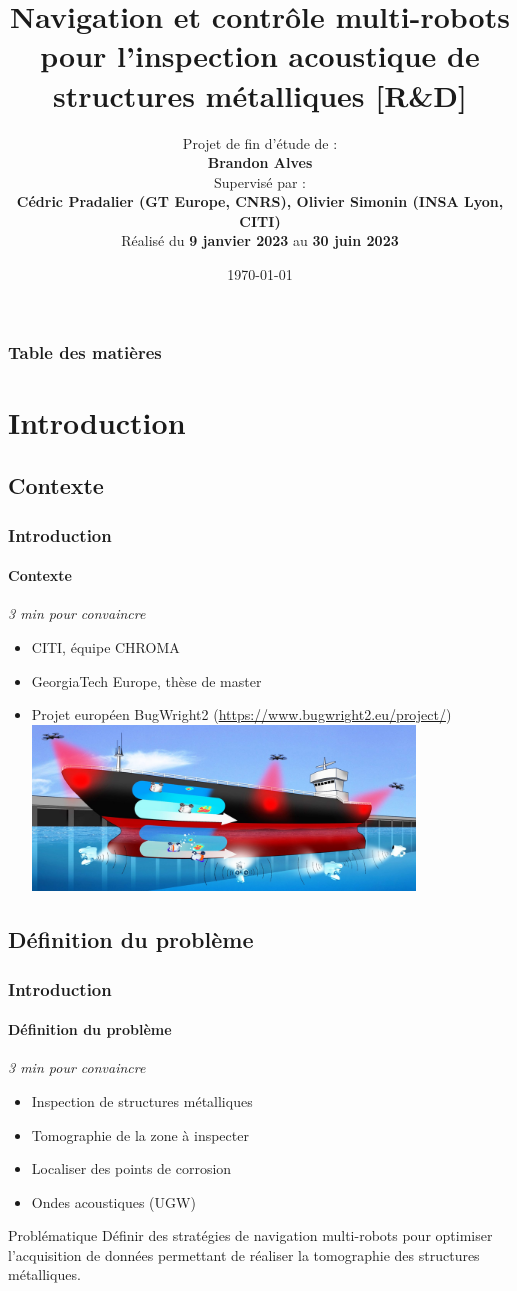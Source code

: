 \documentclass{beamer}
\title[Projet de Fin d'Étude]{Navigation et contrôle multi-robots pour l'inspection acoustique de structures métalliques [R\&D]}
\author[Brandon Alves]{
	Projet de fin d'étude de : \\
	\textbf{Brandon Alves} \\
	\vspace*{.15cm}
	\footnotesize Supervisé par : \\
	\textbf{Cédric Pradalier (GT Europe, CNRS), Olivier Simonin (INSA Lyon, CITI)} \\
	\vspace*{.15cm}
	\footnotesize Réalisé du \textbf{9 janvier 2023} au \textbf{30 juin 2023}
}
\institute[INSA Lyon, CITI]{INSA Lyon, Laboratoire CITI, équipe CHROMA (INSA \& INRIA)}
\date{\today}
\begin{document}
	\begin{frame}
		\titlepage
	\end{frame}
	\begin{frame}[shrink=0]
		\frametitle{Table des matières}
		\tableofcontents
	\end{frame}
	\section{Introduction}
		\subsection*{Contexte}
			\begin{frame}
				\frametitle{Introduction}
				\framesubtitle{Contexte}
				\vspace{-15pt}
				\begin{flushright}
					\textit{3 min pour convaincre}
				\end{flushright}
				\begin{itemize}
					\item CITI, équipe CHROMA
					\item GeorgiaTech Europe, thèse de master
					\item Projet européen BugWright2 (\url{https://www.bugwright2.eu/project/})
					\includegraphics[width=0.8\textwidth]{graphics/Concept-Cartoon-NJ3-e1582812224528.jpg}
				\end{itemize}
			\end{frame}
		\subsection*{Définition du problème}
			\begin{frame}
				\frametitle{Introduction}
				\framesubtitle{Définition du problème}
				\vspace{-15pt}
				\begin{flushright}
					\textit{3 min pour convaincre}
				\end{flushright}
				\begin{itemize}
					\item Inspection de structures métalliques
					\item Tomographie de la zone à inspecter
					\item Localiser des points de corrosion
					\item Ondes acoustiques (UGW)
				\end{itemize}
				\begin{block}{Problématique}
					Définir des stratégies de navigation multi-robots pour optimiser l'acquisition de données permettant de réaliser la tomographie des structures métalliques.
				\end{block}
			\end{frame}
\end{document}
